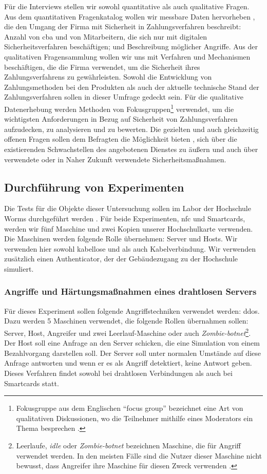 Für die Interviews stellen wir sowohl quantitative als auch qualitative Fragen. Aus dem quantitativen Fragenkatalog
wollen wir messbare Daten hervorheben \cite{refbook:SRJR}, die den Umgang der Firma mit Sicherheit in Zahlungsverfahren
beschreibt: Anzahl von \acrfull{cba} und von Mitarbeitern, die sich nur mit digitalen Sicherheitsverfahren beschäftigen;
und Beschreibung möglicher Angriffe. Aus der qualitativen Fragensammlung wollen wir uns mit Verfahren 
und Mechanismen beschäftigen, die die Firma verwendet, um die Sicherheit ihres Zahlungsverfahrens zu gewährleisten. 
Sowohl die Entwicklung von Zahlungsmethoden bei den Produkten als auch der aktuelle technische Stand der Zahlungsverfahren
sollen in dieser Umfrage gedeckt sein. Für die qualitative Datenerhebung werden Methoden von Fokusgruppen\footnote{Fokusgruppe
aus dem Englischen ``focus group'' bezeichnet eine Art von qualitativen Diskussionen, wo die Teilnehmer mithilfe eines 
Moderators ein Thema besprechen \cite{refbook:APGF}.} verwendet, um die wichtigsten Anforderungen in Bezug auf Sicherheit von 
Zahlungsverfahren aufzudecken, zu analysieren und zu bewerten. Die gezielten und auch gleichzeitig offenen Fragen sollen dem
Befragten die Möglichkeit bieten \cite{refbook:EFAF}, sich über die existierenden Schwachstellen des angebotenen
Dienstes zu äußern und auch über verwendete oder in Naher Zukunft verwendete Sicherheitsmaßnahmen.

\subsection{Durchführung von Experimenten}

Die Tests für die Objekte dieser Untersuchung sollen im Labor der Hochschule Worms durchgeführt werden \cite{refbook:FWDL}. 
Für beide Experimenten, \acrshort{nfc} und Smartcards, werden wir fünf Maschine und zwei Kopien unserer Hochschulkarte verwenden.
Die Maschinen werden folgende Rolle übernehmen: Server und Hosts. Wir verwenden hier sowohl kabellose und als auch Kabelverbindung.
Wir verwenden zusätzlich einen Authenticator, der der Gebäudezugang zu der Hochschule simuliert.


\subsubsection{Angriffe und Härtungsmaßnahmen eines drahtlosen Servers}
Für dieses Experiment sollen folgende Angriffstechniken verwendet werden: \acrfull{ddos}. Dazu werden 5 Maschinen
verwendet, die folgende Rollen übernahmen sollen: Server, Host, Angreifer und zwei Leerlauf-Maschine oder auch 
\textit{Zombie-botnet}\footnote{Leerlaufe, \textit{idle} oder \textit{Zombie-botnet} bezeichnen Maschine, die für 
Angriff verwendet werden. In den meisten Fälle sind die Nutzer dieser Maschine nicht bewusst, dass Angreifer ihre
Maschine für diesen Zweck verwenden \cite{refart:XGDD}.}. Der Host soll eine Anfrage an den Server schicken, die
eine Simulation von einem Bezahlvorgang darstellen soll. Der Server soll unter normalen Umstände auf diese Anfrage
antworten und wenn er es als Angriff detektiert, keine Antwort geben. Dieses Verfahren findet sowohl bei drahtlosen
Verbindungen als auch bei Smartcards statt.

